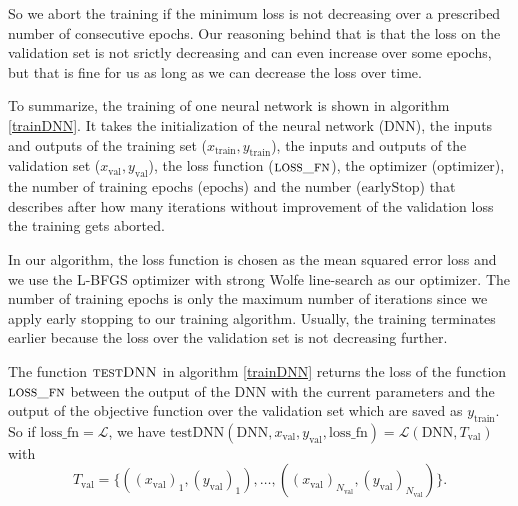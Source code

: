 So we abort the training if the minimum loss is not decreasing over a prescribed number of consecutive epochs. Our reasoning behind that is that the loss on the validation set is not srictly decreasing and can even increase over some epochs, but that is fine for us as long as we can decrease the loss over time.

To summarize, the training of one neural network is shown in algorithm \ref{trainDNN}. It takes the initialization of the neural network ($\mathrm{DNN}$), the inputs and outputs of the training set ($x_\mathrm{train}, y_\mathrm{train}$), the inputs and outputs of the validation set ($x_\mathrm{val}, y_\mathrm{val}$), the loss function ($\textproc{loss\_fn}$), the optimizer ($\mathrm{optimizer}$), the number of training epochs ($\mathrm{epochs}$) and the number ($\mathrm{earlyStop}$) that describes after how many iterations without improvement of the validation loss the training gets aborted.

In our algorithm, the loss function is chosen as the mean squared error loss and we use the L-BFGS optimizer with strong Wolfe line-search as our optimizer. The number of training epochs is only the maximum number of iterations since we apply early stopping to our training algorithm. Usually, the training terminates earlier because the loss over the validation set is not decreasing further.

The function $\textproc{testDNN}$ in algorithm \ref{trainDNN} returns the loss of the function $\textproc{loss\_fn}$ between the output of the DNN with the current parameters and the output of the objective function over the validation set which are saved as $y_\mathrm{train}$. So if $\mathrm{loss\_fn}=\mathscr{L}$, we have $\mathrm{testDNN}(\mathrm{DNN}, x_\mathrm{val}, y_\mathrm{val}, \mathrm{loss\_fn}) = \mathscr{L}(\mathrm{DNN}, T_\mathrm{val})$ with
\begin{displaymath}
T_\mathrm{val}=\{((x_\mathrm{val})_1,(y_\mathrm{val})_1),\dotsc,((x_\mathrm{val})_{N_\mathrm{val}},(y_\mathrm{val})_{N_\mathrm{val}})\}.
\end{displaymath}

